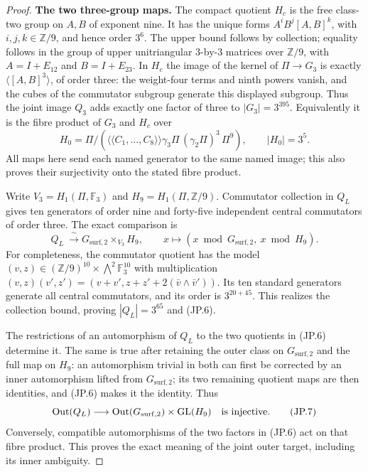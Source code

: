 \begin{proof}
\par\medskip\noindent\textbf{The two three-group maps.}\quad
The compact quotient $H_c$ is the free class-two group on $A,B$
of exponent nine.  It has the unique forms
$A^iB^j[A,B]^k$, with $i,j,k\in\mathbb Z/9$, and hence order
$3^6$.  The upper bound follows by collection; equality follows
in the group of upper unitriangular $3$-by-$3$ matrices over
$\mathbb Z/9$, with $A=I+E_{12}$ and $B=I+E_{23}$.
In $H_c$ the image of the kernel of $\Pi\to G_3$ is exactly
$\langle[A,B]^3\rangle$, of order three: the weight-four terms
and ninth powers vanish, and the cubes of the commutator
subgroup generate this displayed subgroup.  Thus the joint
image $Q_3$ adds exactly one factor of three to $|G_3|=3^{395}$.
Equivalently it is the fibre product of $G_3$ and $H_c$ over
\[
 H_0=\Pi/(\langle\!\langle C_1,\ldots,C_8\rangle\!\rangle
                \gamma_3\Pi\,(\gamma_2\Pi)^3\,\Pi^9),
 \qquad |H_0|=3^5.                                    \tag{JP.5}
\]
All maps here send each named generator to the same named
image; this also proves their surjectivity onto the stated
fibre product.

Write $V_3=H_1(\Pi,\mathbb F_3)$ and
$H_9=H_1(\Pi,\mathbb Z/9)$.  Commutator collection in $Q_L$
gives ten generators of order nine and forty-five independent
central commutators of order three.  The exact comparison is
\[
 Q_L\ \xrightarrow{\ \sim\ }
 G_{\mathrm{surf},2}\mathbin{\times}_{V_3}H_9,
 \qquad x\longmapsto(x\bmod G_{\mathrm{surf},2},\ x\bmod H_9).
                                                               \tag{JP.6}
\]
For completeness, the commutator quotient has the model
$(v,z)\in(\mathbb Z/9)^{10}\times\bigwedge^2\mathbb F_3^{10}$
with multiplication
$(v,z)(v',z')=(v+v',z+z'+2(\bar v\wedge\bar v'))$.
Its ten standard generators generate all central commutators,
and its order is $3^{20+45}$.  This realizes the collection
bound, proving $|Q_L|=3^{65}$ and (JP.6).

The restrictions of an automorphism of $Q_L$ to the two quotients
in (JP.6) determine it.  The same is true after retaining the
outer class on $G_{\mathrm{surf},2}$ and the full map on $H_9$:
an automorphism trivial in both can first be corrected by an
inner automorphism lifted from $G_{\mathrm{surf},2}$; its two
remaining quotient maps are then identities, and (JP.6) makes
it the identity.  Thus
\[
 \operatorname{Out}(Q_L)\longrightarrow
 \operatorname{Out}(G_{\mathrm{surf},2})
                   \times\operatorname{GL}(H_9)
 \quad\hbox{is injective}.                              \tag{JP.7}
\]
Conversely, compatible automorphisms of the two factors in
(JP.6) act on that fibre product.  This proves the exact meaning
of the joint outer target, including its inner ambiguity.


\end{proof}
